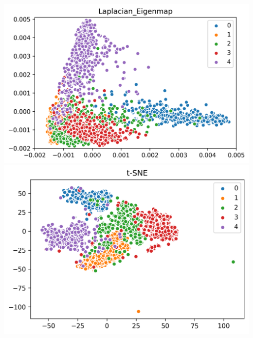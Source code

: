 \documentclass[12pt]{article}
\begin{document}
\begin{center}
    \includegraphics[width=15cm]{Q3_Laplacian_Eigenmap.png}
    \includegraphics[width=15cm]{Q3_t-SNE.png}
\end{center}
\end{document}
